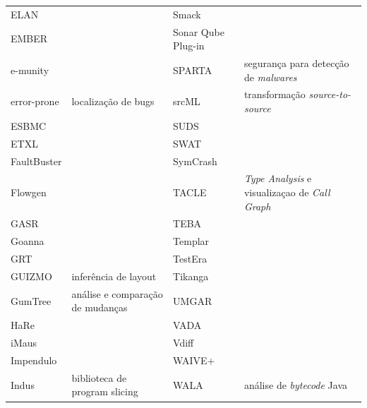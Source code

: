 \begin{table}[H]
{\begin{tabular}{| l | l | l | l |}
  ELAN                &                                  & Smack               &                                      \\
  EMBER               &                                  & Sonar Qube Plug-in  &                                      \\
  e-munity            &                                  & SPARTA              & segurança para detecção de {\it malwares} \\
  error-prone         & localização de bugs              & srcML               & transformação {\it source-to-source} \\
  ESBMC               &                                  & SUDS                &                                      \\
  ETXL                &                                  & SWAT                &                                      \\
  FaultBuster         &                                  & SymCrash            &                                      \\
  Flowgen             &                                  & TACLE               & {\it Type Analysis} e visualizaçao de {\it Call Graph} \\
  GASR                &                                  & TEBA                &                                      \\
  Goanna              &                                  & Templar             &                                      \\
  GRT                 &                                  & TestEra             &                                      \\
  GUIZMO              & inferência de layout             & Tikanga             &                                      \\
  GumTree             & análise e comparação de mudanças & UMGAR               &                                      \\
  HaRe                &                                  & VADA                &                                      \\
  iMaus               &                                  & Vdiff               &                                      \\
  Impendulo           &                                  & WAIVE+              &                                      \\
  Indus               & biblioteca de program slicing    & WALA                & análise de {\it bytecode} Java       \\

\end{tabular}}
\end{table}
